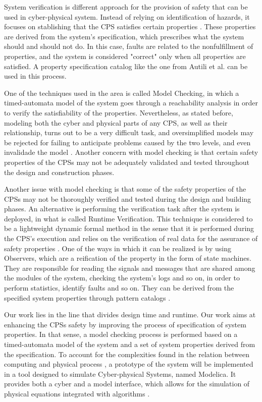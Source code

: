 System verification is different approach for the provision of safety that can be used in cyber-physical system. Instead of relying on identification of hazards, it focuses on stablishing that the CPS satisfies certain properties \cite{2008PrinciplesModelChecking}. These properties are derived from the system's specification, which prescribes what the system should and should not do. In this case, faults are related to the nonfulfillment of properties, and the system is considered "correct" only when all properties are satisfied. A property specification catalog like the one from Autili et al. \cite{2015PropertySpecCatalog} can be used in this process. 

One of the techniques used in the area is called Model Checking, in which a timed-automata model of the system goes through a reachability analysis in order to verify the satisfiability of the properties. Nevertheless, as stated before, modeling both the cyber and physical parts of any CPS, as well as their relationship, turns out to be a very difficult task, and oversimplified models may be rejected for failing to anticipate problems caused by the two levels, and even invalidade the model \cite{2014PerceptionsSOTAV&VCPS}. Another concern with model checking is that certain safety properties of the CPSs may not be adequately validated and tested throughout the design and construction phases.

Another issue with model checking is that some of the safety properties of the CPSs may not be thoroughly verified and tested during the design and building phases. An alternative is performing the verification task after the system is deployed, in what is called Runtime Verification. This technique is considered to be a lightweight dynamic formal method in the sense that it is performed during the CPS's execution and relies on the verification of real data for the assurance of safety properties \cite{colombo2021runtime}. One of the ways in which it can be realized is by using Observers, which are a reification of the property in the form of state machines. They are responsible for reading the signals and messages that are shared among the modules of the system, checking the system's logs and so on, in order to perform statistics, identify faults and so on. They can be derived from the specified system properties through pattern catalogs \cite{2022PSP}.

Our work lies in the line that divides design time and runtime. Our work aims at enhancing the CPSs safety by improving the process of specification of system properties. In that sense, a model checking process is performed based on a timed-automata model of the system and a set of system properties derived from the specification. To account for the complexities found in the relation between computing and physical process \cite{2014PerceptionsSOTAV&VCPS}, a prototype of the system will be implemented in a tool designed to simulate Cyber-physical Systems, named Modelica. It provides both a cyber and a model interface, which allows for the simulation of physical equations integrated with algorithms \cite{fritzson2011introduction}. 

